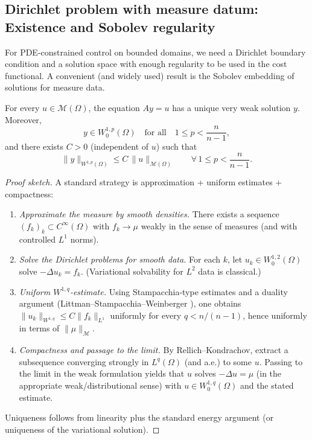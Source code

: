 \documentclass[11pt,a4paper]{article}
\begin{document}
\subsection{Dirichlet problem with measure datum: Existence and Sobolev regularity}
For PDE-constrained control on bounded domains, we need a Dirichlet boundary
condition and a solution space with enough regularity to be used in the cost functional.
A convenient (and widely used) result is the Sobolev embedding of solutions for
measure data.

\begin{proposition}\label{prop:elliptic_measure}
For every $u\in\mathcal{M}(\Omega)$, the equation $Ay=u$ has a unique very weak solution $y$.
Moreover,
\[
y \in W^{1,p}_0(\Omega)
\quad\text{for all}\quad 1\le p<\frac{n}{n-1},
\]
and there exists $C>0$ (independent of $u$) such that
\begin{equation}\label{eq:W1p_estimate}
\|y\|_{W^{1,p}(\Omega)} \le C\,\|u\|_{\mathcal{M}(\Omega)}
\qquad \forall\,1\le p<\frac{n}{n-1}.
\end{equation}
\end{proposition}


\begin{proof}[Proof sketch]
A standard strategy is approximation + uniform estimates + compactness:
\begin{enumerate}
\item \emph{Approximate the measure by smooth densities.}
There exists a sequence $(f_k)_k\subset C^\infty(\Omega)$ with $f_k\to\mu$ weakly
in the sense of measures (and with controlled $L^1$ norms). 
\item \emph{Solve the Dirichlet problems for smooth data.}
For each $k$, let $u_k\in W^{1,2}_0(\Omega)$ solve $-\Delta u_k=f_k$.
(Variational solvability for $L^2$ data is classical.) 
\item \emph{Uniform $W^{1,q}$-estimate.}
Using Stampacchia-type estimates and a duality argument (Littman--Stampacchia--Weinberger \cite{littman_stampacchia_weinberger_1963}),
one obtains $\|u_k\|_{W^{1,q}}\le C\|f_k\|_{L^1}$ uniformly for every $q<n/(n-1)$,
hence uniformly in terms of $\|\mu\|_{\mathcal{M}}$. 
\item \emph{Compactness and passage to the limit.}
By Rellich--Kondrachov, extract a subsequence converging strongly in $L^q(\Omega)$
(and a.e.) to some $u$. 
Passing to the limit in the weak formulation yields that $u$ solves $-\Delta u=\mu$
(in the appropriate weak/distributional sense) with $u\in W^{1,q}_0(\Omega)$ and the stated estimate.
\end{enumerate}
Uniqueness follows from linearity plus the standard energy argument (or uniqueness of the variational solution).    
\end{proof}
\end{document}
